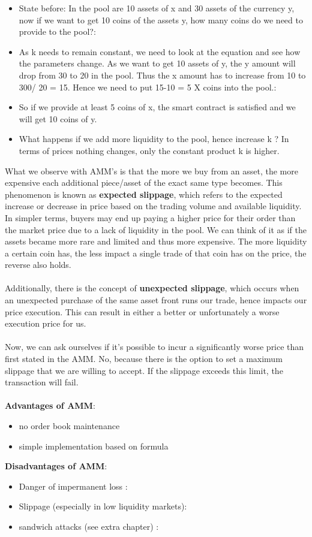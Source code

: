 \documentclass{article}
\begin{document}
\begin{itemize}
    \item {State before: In the pool are 10 assets of x and 30 assets of the currency y, now if we want to get 10 coins of the assets y, how many coins do we need to provide to the pool?}: 
    \item {As k needs to remain constant, we need to look at the equation and see how the parameters change. As we want to get 10 assets of y, the y amount will drop from 30 to 20 in the pool. Thus the x amount has to increase from 10 to 300/ 20 = 15. Hence we need to put 15-10 = 5 X coins into the pool.}:  
    \item {So if we provide at least 5 coins of x, the smart contract is satisfied and we will get 10 coins of y.}
\item {What happens if we add more liquidity to the pool, hence increase k ? In terms of prices nothing changes, only the constant product k is higher.}
\end{itemize}What we observe with AMM's is that the more we buy from an asset, the more expensive each additional piece/asset of the exact same type becomes. This phenomenon is known as \textbf{expected slippage}, which refers to the expected increase or decrease in price based on the trading volume and available liquidity. In simpler terms, buyers may end up paying a higher price for their order than the market price due to a lack of liquidity in the pool. We can think of it as if the assets became more rare and limited and thus more expensive. The more liquidity a certain coin has, the less impact a single trade of that coin has on the price, the reverse also holds.\\
\\
Additionally, there is the concept of \textbf{unexpected slippage}, which occurs when an unexpected purchase of the same asset front runs our trade, hence impacts our price execution. This can result in either a better or unfortunately a worse execution price for us.\\
\\
Now, we can ask ourselves if it's possible to incur a significantly worse price than first stated in the AMM. No, because there is the option to set a maximum slippage that we are willing to accept. If the slippage exceeds this limit, the transaction will fail.\\ \\
\textbf{Advantages of AMM}:
\begin{itemize}
    \item {no order book maintenance}
    \item {simple implementation based on formula}

\end{itemize}
\textbf{Disadvantages of AMM}:
\begin{itemize}
    \item {Danger of impermanent loss }: 
    \item {Slippage (especially in low liquidity markets)}: 
    \item {sandwich attacks (see extra chapter) }:  
\end{itemize}
\end{document}
